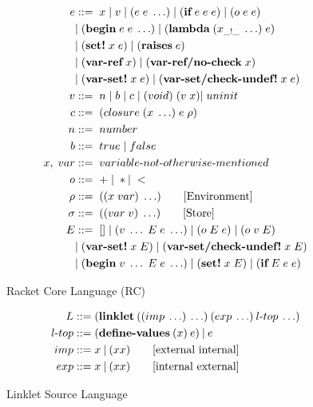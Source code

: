 \documentclass[sigplan,screen,anonymous]{acmart}
\def\dash {\text{-}}
\begin{document}
\begin{figure}[tbp]
  \begin{align*}
    e &::=\; x\; |\; v\; |\; (e\; e\; \ldots)\; |\; (\textbf{if}\; e\; e\; e)\; |\; (o\; e\; e)\; \\
    \; &|\; (\textbf{begin}\; e\; e\; \ldots)\; |\; (\textbf{lambda}\; (x_{\_!\_}\; \ldots)\; e)\\
    \; &|\; (\textbf{set!}\; x\; e)\; |\; (\textbf{raises}\; e)\\
    \; &|\; (\textbf{var\dash ref}\; x)\; |\; (\textbf{var\dash ref/no\dash check}\; x) \\
    \; &|\; (\textbf{var\dash set!}\; x\; e)\; |\; (\textbf{var\dash set/check\dash undef!}\; x\; e) \\
    v   &::=\; n\; |\; b\; |\; c\; |\; (void)\; (v\; x)|\; uninit \\ %
    c   &::=\; (closure\; (x\; \ldots)\; e\; \rho) \\
    n   &::=\; number \\
    b   &::=\; true\; |\; false \\
    x,\; var &::=\; variable\dash not\dash otherwise\dash mentioned \\ %
    o  &::=\; +\; |\; * |\; < \\
    \rho   &::=\; ((x\; var)\; \ldots) \tag*{[Environment]}\\
    \sigma   &::=\; ((var\; v)\; \ldots) \tag*{[Store]}\\
    E   &::=\; []\; |\; (v\; \ldots\; E\; e\; \ldots)\; |\; (o\; E\; e)\; |\; (o\; v\; E) \\
    \;  &|\; (\textbf{var\dash set!}\; x\; E)\; |\; (\textbf{var\dash set/check\dash undef!}\; x\; E) \\
    \;  &|\; (\textbf{begin}\; v\; \ldots\; E\; e\; \ldots)\; |\; (\textbf{set!}\; x\; E)\; |\; (\textbf{if}\; E\; e\; e)
  \end{align*}
  \caption{Racket Core Language (RC)}
  \label{fig:racket-source}
\end{figure}

\begin{figure}[tbp]
  \begin{align*}
    L  &::= (\textbf{linklet}\:((imp\: \ldots)\: \ldots)\:(exp\: \ldots)\:l\dash top\:\ldots)\\
    l\dash top &::= (\textbf{define\dash values}\:(x)\:e)\:|\:e \\
    imp &::= x\:|\:(x x) \tag*{[external internal]}\\
    exp &::= x\:|\:(x x) \tag*{[internal external]}
  \end{align*}
  \caption{Linklet Source Language}
  \label{fig:linklet-source}
\end{figure}
\end{document}
